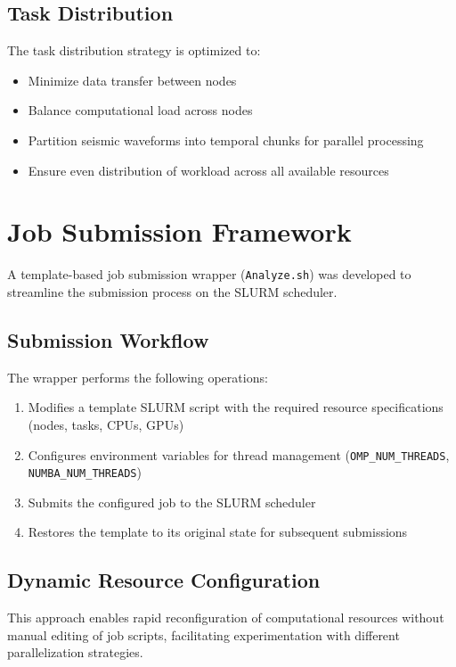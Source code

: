 \subsection{Task Distribution}
The task distribution strategy is optimized to:

\begin{itemize}
  \item Minimize data transfer between nodes
  \item Balance computational load across nodes
  \item Partition seismic waveforms into temporal chunks for parallel
    processing
  \item Ensure even distribution of workload across all available resources
\end{itemize}

\section{Job Submission Framework}

A template-based job submission wrapper (\texttt{Analyze.sh}) was developed to
streamline the submission process on the SLURM scheduler.

\subsection{Submission Workflow}
The wrapper performs the following operations:

\begin{enumerate}
  \item Modifies a template SLURM script with the required resource
    specifications (nodes, tasks, CPUs, GPUs)

  \item Configures environment variables for thread management
    (\texttt{OMP\_NUM\_THREADS}, \texttt{NUMBA\_NUM\_THREADS})

  \item Submits the configured job to the SLURM scheduler

  \item Restores the template to its original state for subsequent submissions
\end{enumerate}

\subsection{Dynamic Resource Configuration}
This approach enables rapid reconfiguration of computational resources without
manual editing of job scripts, facilitating experimentation with different
parallelization strategies.

